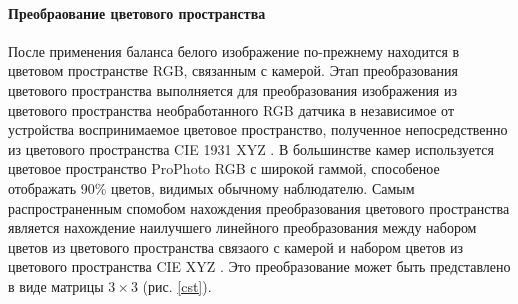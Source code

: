 \paragraph{Преобраование цветового пространства}

После применения баланса белого изображение по-прежнему находится в цветовом пространстве RGB, связанным с камерой. Этап преобразования цветового пространства выполняется для преобразования изображения из цветового пространства необработанного RGB датчика в независимое от устройства воспринимаемое цветовое пространство, полученное непосредственно из цветового пространства CIE 1931 XYZ \cite{lib-cie}. В большинстве камер используется цветовое пространство ProPhoto RGB с широкой гаммой, способеное отображать 90\% цветов, видимых обычному наблюдателю. Самым распространенным спомобом нахождения преобразования цветового пространства является нахождение наилучшего линейного преобразования между набором цветов из цветового пространства связаого с камерой и набором цветов из цветового пространства CIE XYZ \cite{lib-brown-cst}. Это преобразование может быть представлено в виде матрицы $3 \times 3$ (рис. \ref{cst}).

